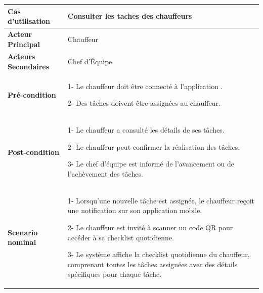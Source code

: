 \begin{table}[htbp]
  \centering
  \renewcommand{\arraystretch}{1.7} %
  \begin{tabular}{|p{4cm}|p{9cm}|}
    \hline
    \textbf{Cas d'utilisation}    & Consulter les taches des chauffeurs                                                                                 \\
    \hline
    \textbf{Acteur Principal }    & Chauffeur                                                                                                           \\
    \hline
    \textbf{Acteurs Secondaires } & Chef d’Équipe                                                                                                       \\
    \hline
    \textbf{Pré-condition}        & 1- Le chauffeur doit être connecté à l'application .\newline

    2-  Des tâches doivent être assignées au chauffeur.                                                                                                 \\
    \hline
    \textbf{Post-condition}       & 1- Le chauffeur a consulté les détails de ses tâches.\newline

    2- Le chauffeur peut confirmer la réalisation des tâches.\newline

    3- Le chef d’équipe est informé de l’avancement ou de l’achèvement des tâches.                                                                      \\

    \hline
    \textbf{Scenario nominal}     & 1- Lorsqu’une nouvelle tâche est assignée, le chauffeur reçoit une notification sur son application mobile.
    \newline


    2- Le chauffeur est invité à scanner un code QR pour accéder à sa checklist quotidienne.\newline

    3- Le système affiche la checklist quotidienne du chauffeur, comprenant toutes les tâches assignées avec des détails spécifiques pour chaque tâche. \\
  \end{tabular}

\end{table}

